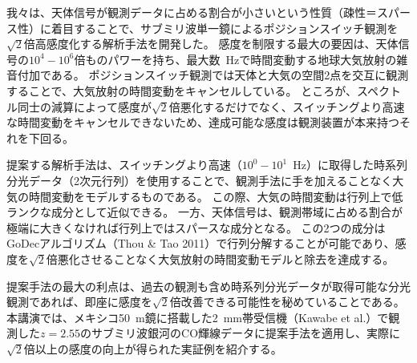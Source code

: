 \documentclass[ja]{2020b}
\begin{document}

我々は、天体信号が観測データに占める割合が小さいという性質（疎性＝スパース性）に着目することで、サブミリ波単一鏡によるポジションスイッチ観測を$\sqrt{2}$倍高感度化する解析手法を開発した。
感度を制限する最大の要因は、天体信号の$10^{4}-10^{6}$倍ものパワーを持ち、最大数~Hzで時間変動する地球大気放射の雑音付加である。
ポジションスイッチ観測では天体と大気の空間2点を交互に観測することで、大気放射の時間変動をキャンセルしている。
ところが、スペクトル同士の減算によって感度が$\sqrt{2}$倍悪化するだけでなく、スイッチングより高速な時間変動をキャンセルできないため、達成可能な感度は観測装置が本来持つそれを下回る。

提案する解析手法は、スイッチングより高速（$10^{0}-10^{1}$~Hz）に取得した時系列分光データ（2次元行列）を使用することで、観測手法に手を加えることなく大気の時間変動をモデルするものである。
この際、大気の時間変動は行列上で低ランクな成分として近似できる。
一方、天体信号は、観測帯域に占める割合が極端に大きくなければ行列上ではスパースな成分となる。
この2つの成分はGoDecアルゴリズム（Thou \& Tao 2011）で行列分解することが可能であり、感度を$\sqrt{2}$倍悪化させることなく大気放射の時間変動モデルと除去を達成する。

提案手法の最大の利点は、過去の観測も含め時系列分光データが取得可能な分光観測であれば、即座に感度を$\sqrt{2}$倍改善できる可能性を秘めていることである。
本講演では、メキシコ50~m鏡に搭載した2~mm帯受信機（Kawabe et al.）で観測した$z=2.55$のサブミリ波銀河のCO輝線データに提案手法を適用し、実際に$\sqrt{2}$倍以上の感度の向上が得られた実証例を紹介する。



\end{document}
